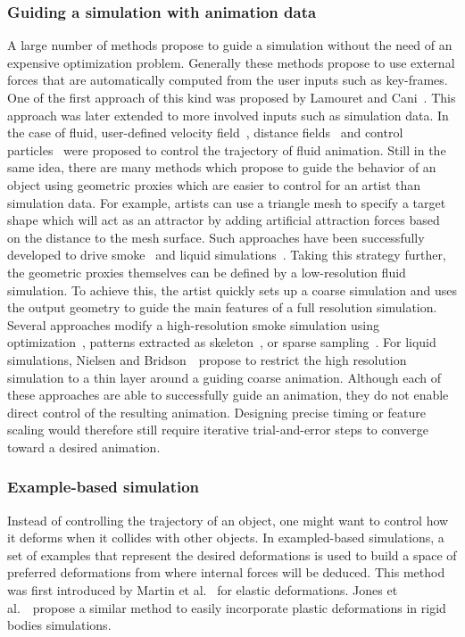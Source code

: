\subsubsection{Guiding a simulation with animation data}
A large number of methods propose to guide a simulation without the need of an expensive optimization problem. 
Generally these methods propose to use external forces that are automatically computed from the user inputs such as key-frames.
One of the first approach of this kind was proposed by Lamouret and Cani~\cite{Lamouret1996}.
This approach was later extended to more involved inputs such as simulation data.
In the case of fluid, user-defined velocity field~\cite{Kim2006:SmokeControl}, distance fields~\cite{Yang2013} and control particles~\cite{Thurey2006:FluidControl,Madill2013} were proposed to control the trajectory of fluid animation.
Still in the same idea, there are many methods which propose to guide the behavior of an object using geometric proxies which are easier to control for an artist than simulation data. For example, artists can use a triangle mesh to specify a target shape which will act as an attractor by adding artificial attraction forces based on the distance to the mesh surface. 
Such approaches have been successfully developed to drive smoke~\cite{Fattal2004,Hong2004,Shi2005a} and liquid simulations~\cite{Shi2005b,Raveendran2012}.
Taking this strategy further, the geometric proxies themselves can be defined by a low-resolution fluid simulation. 
To achieve this, the artist quickly sets up a coarse simulation and uses the output geometry to guide the main features of a full resolution simulation.
Several approaches modify a high-resolution smoke simulation using optimization~\cite{Nielsen2009,Nielsen2010}, patterns extracted as skeleton~\cite{Yuan2011}, or sparse sampling~\cite{Huang2013}.
For liquid simulations, Nielsen and Bridson~\cite{Nielsen2011}~propose to restrict the high resolution simulation to a thin layer around a guiding coarse animation.
Although each of these approaches are able to successfully guide an animation, they do not enable direct control of the resulting animation. Designing precise timing or feature scaling would therefore still require iterative trial-and-error steps to converge toward a desired animation.

\subsubsection{Example-based simulation}
Instead of controlling the trajectory of an object, one might want to control how it deforms when it collides with other objects. 
In exampled-based simulations, a set of examples that represent the desired deformations is used to build a space of preferred deformations from where internal forces will be deduced. This method was first introduced by Martin et al.~\cite{Martin2011} for elastic deformations. Jones et al.~\cite{Jones2016}~propose a similar method to easily incorporate plastic deformations in rigid bodies simulations.


